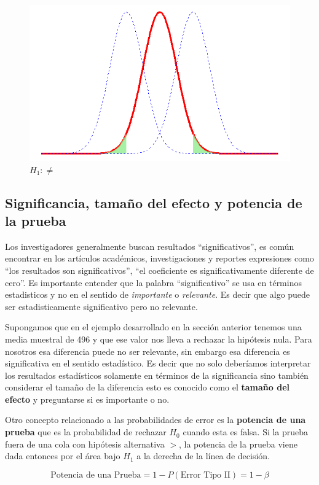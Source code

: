 \documentclass[]{book}
\begin{document}
\begin{figure}[h]

{\centering \includegraphics[width=0.5\linewidth]{ph2c} 

}

\caption{$H_1:\neq$}\label{fig:ph2c}
\end{figure}

\subsection{Significancia, tamaño del efecto y potencia de la
prueba}\label{significancia-tamano-del-efecto-y-potencia-de-la-prueba}

Los investigadores generalmente buscan resultados ``significativos'', es
común encontrar en los artículos académicos, investigaciones y reportes
expresiones como ``los resultados son significativos'', ``el coeficiente
es significativamente diferente de cero''. Es importante entender que la
palabra ``significativo'' se usa en términos estadisticos y no en el
sentido de \emph{importante} o \emph{relevante}. Es decir que algo puede
ser estadisticamente significativo pero no relevante.

Supongamos que en el ejemplo desarrollado en la sección anterior tenemos
una media muestral de 496 y que ese valor nos lleva a rechazar la
hipótesis nula. Para nosotros esa diferencia puede no ser relevante, sin
embargo esa diferencia es significativa en el sentido estadístico. Es
decir que no solo deberíamos interpretar los resultados estadísticos
solamente en términos de la significancia sino también considerar el
tamaño de la diferencia esto es conocido como el \textbf{tamaño del
efecto} y preguntarse si es importante o no.

Otro concepto relacionado a las probabilidades de error es la
\textbf{potencia de una prueba} que es la probabilidad de rechazar
\(H_0\) cuando esta es falsa. Si la prueba fuera de una cola con
hipótesis alternativa \(>\), la potencia de la prueba viene dada
entonces por el área bajo \(H_1\) a la derecha de la línea de decisión.

\begin{equation} 
\text{Potencia de una Prueba}=1-P\left(\text{Error Tipo II}\right)=1-\beta
\label{eq:power}
\end{equation}
\end{document}
